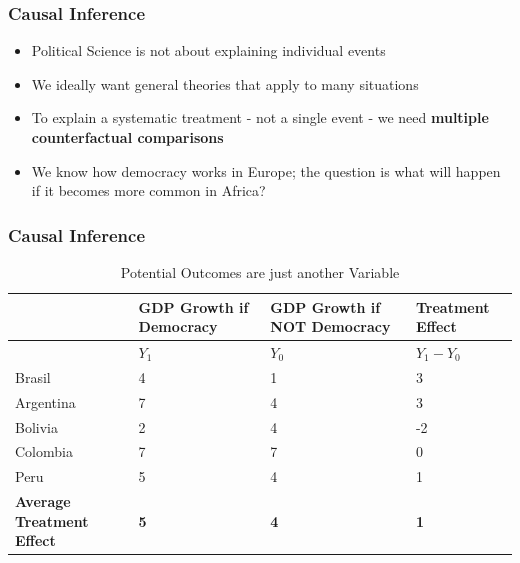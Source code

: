 \documentclass[xcolor=x11names,compress]{beamer}\usepackage[]{graphicx}\usepackage[]{color}
\renewcommand{\(}{\begin{columns}}
\renewcommand{\)}{\end{columns}}
\newcommand{\<}[1]{\begin{column}{#1}}
\renewcommand{\>}{\end{column}}
\begin{document}
\begin{frame}
\frametitle{Causal Inference}
\begin{itemize}
\item Political Science is not about explaining individual events
\pause
\item We ideally want general theories that apply to many situations
\pause
\item To explain a systematic treatment - not a single event - we need \textbf{multiple counterfactual comparisons}
\pause
\item We know how democracy works in Europe; the question is what will happen if it becomes more common in Africa?
\pause
{}
\end{itemize}
\end{frame}

\begin{frame}
\frametitle{Causal Inference}
\footnotesize
\begin{table}[htbp]
  \centering
  \caption{Potential Outcomes are just another Variable}
    \begin{tabular}{|p{2.4cm}|p{2.4cm}|p{2.4cm}|p{2.4cm}|}
    \hline
          & \multicolumn{1}{p{2.4cm}|}{GDP Growth if Democracy} & \multicolumn{1}{p{2.4cm}|}{GDP Growth if  NOT Democracy} & Treatment Effect \bigstrut\\
    \hline
          & \multicolumn{1}{p{2.4cm}|}{$Y_1$} & \multicolumn{1}{l|}{$Y_0$} & \multicolumn{1}{l|}{$Y_{1} - Y_{0}$} \bigstrut\\
    \hline
    Brasil & 4     & 1     & 3 \bigstrut\\
    \hline
    Argentina & 7    & 4     & 3 \bigstrut\\
    \hline
    Bolivia & 2     & 4     & -2 \bigstrut\\
    \hline
    Colombia & 7    & 7    & 0 \bigstrut\\
    \hline
    Peru & 5     & 4     & 1 \bigstrut\\
    \hline
    \textbf{Average Treatment Effect} & \textbf{5} & \textbf{4} & \textbf{1} \bigstrut\\
    \hline
    \end{tabular}%
  \label{tab:addlabel}%
\end{table}%
\normalsize
\end{frame}
\end{document}
